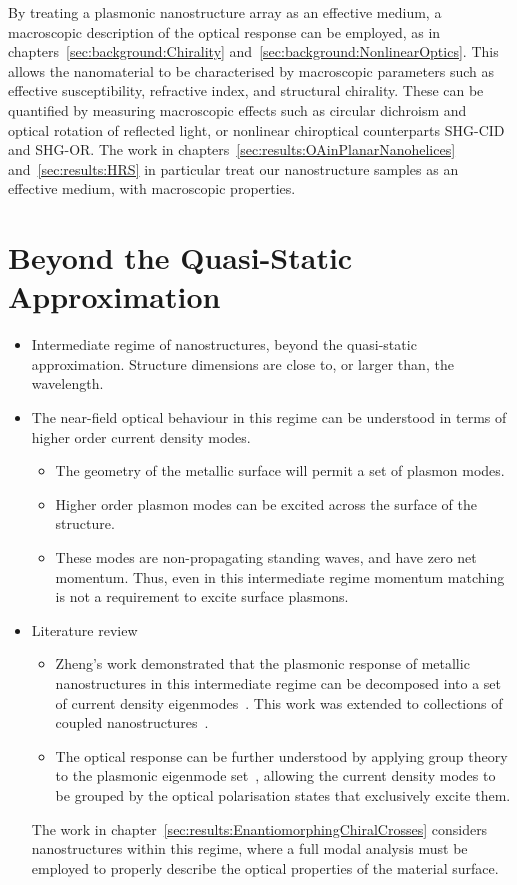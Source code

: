 By treating a plasmonic nanostructure array as an effective medium, a macroscopic description of the optical response can be employed, as in chapters~\ref{sec:background:Chirality} and~\ref{sec:background:NonlinearOptics}. This allows the nanomaterial to be characterised by macroscopic parameters such as effective susceptibility, refractive index, and structural chirality. These can be quantified by measuring macroscopic effects such as circular dichroism and optical rotation of reflected light, or nonlinear chiroptical counterparts SHG-CID and SHG-OR. The work in chapters~\ref{sec:results:OAinPlanarNanohelices} and~\ref{sec:results:HRS} in particular treat our nanostructure samples as an effective medium, with macroscopic properties.

\section{Beyond the Quasi-Static Approximation}
\color{red}
\begin{itemize}
    \item Intermediate regime of nanostructures, beyond the quasi-static approximation. Structure dimensions are close to, or larger than, the wavelength.
    \item The near-field optical behaviour in this regime can be understood in terms of higher order current density modes.
    \begin{itemize}
        \item The geometry of the metallic surface will permit a set of plasmon modes.
        \item Higher order plasmon modes can be excited across the surface of the structure.
        \item These modes are non-propagating standing waves, and have zero net momentum. Thus, even in this intermediate regime momentum matching is not a requirement to excite surface plasmons.
    \end{itemize}
    \item Literature review
    \begin{itemize}
        \item Zheng's work demonstrated that the plasmonic response of metallic nanostructures in this intermediate regime can be decomposed into a set of current density eigenmodes~\cite{Zheng2012}. This work was extended to collections of coupled nanostructures~\cite{Zheng2013}. 
        \item The optical response can be further understood by applying group theory to the plasmonic eigenmode set~\cite{Zheng2015}, allowing the current density modes to be grouped by the optical polarisation states that exclusively excite them.
    \end{itemize}

    The work in chapter~\ref{sec:results:EnantiomorphingChiralCrosses} considers nanostructures within this regime, where a full modal analysis must be employed to properly describe the optical properties of the material surface.
\end{itemize}
\color{black}

